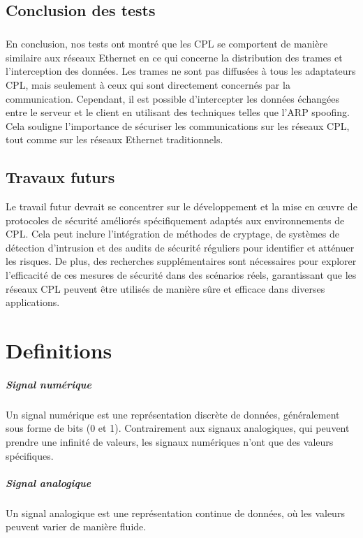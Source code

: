 \documentclass[a4paper,twocolumn]{report}
\begin{document}
\section{Conclusion des tests}
\paragraph{}En conclusion, nos tests ont montré que les CPL se comportent de manière similaire aux réseaux Ethernet en ce qui concerne la distribution des trames et l'interception des données. Les trames ne sont pas diffusées à tous les adaptateurs CPL, mais seulement à ceux qui sont directement concernés par la communication. Cependant, il est possible d'intercepter les données échangées entre le serveur et le client en utilisant des techniques telles que l'ARP spoofing. Cela souligne l'importance de sécuriser les communications sur les réseaux CPL, tout comme sur les réseaux Ethernet traditionnels.

\section{Travaux futurs}
Le travail futur devrait se concentrer sur le développement et la mise en œuvre de protocoles de sécurité améliorés spécifiquement adaptés aux environnements de CPL. Cela peut inclure l'intégration de méthodes de cryptage, de systèmes de détection d'intrusion et des audits de sécurité réguliers pour identifier et atténuer les risques. De plus, des recherches supplémentaires sont nécessaires pour explorer l'efficacité de ces mesures de sécurité dans des scénarios réels, garantissant que les réseaux CPL peuvent être utilisés de manière sûre et efficace dans diverses applications.

\appendix
\chapter{Definitions}
\paragraph{Signal numérique} Un signal numérique est une représentation discrète de données, généralement sous forme de bits (0 et 1). Contrairement aux signaux analogiques, qui peuvent prendre une infinité de valeurs, les signaux numériques n'ont que des valeurs spécifiques.
\paragraph{Signal analogique} Un signal analogique est une représentation continue de données, où les valeurs peuvent varier de manière fluide.
\end{document}
